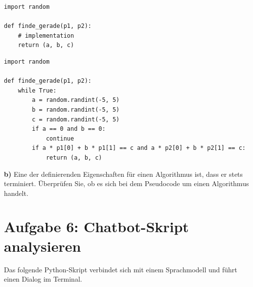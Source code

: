 \begin{lstlisting}[style=python]
import random

def finde_gerade(p1, p2):
    # implementation
    return (a, b, c)
\end{lstlisting}

\ifdefined\zeigloesungen
\begin{tcolorbox}[
    colback=loesungbg, colframe=loesungframe,
    fonttitle=\bfseries\small, title=L{\"o}sung,
    left=4pt, right=4pt, top=2pt, bottom=2pt,
    before skip=4pt, after skip=4pt
]
\begin{lstlisting}[style=python]
import random

def finde_gerade(p1, p2):
    while True:
        a = random.randint(-5, 5)
        b = random.randint(-5, 5)
        c = random.randint(-5, 5)
        if a == 0 and b == 0:
            continue
        if a * p1[0] + b * p1[1] == c and a * p2[0] + b * p2[1] == c:
            return (a, b, c)
\end{lstlisting}
\end{tcolorbox}
\fi
\medskip

\noindent \textbf{b)} Eine der definierenden Eigenschaften für einen Algorithmus ist, dass er stets terminiert. Überprüfen Sie, ob es sich bei dem Pseudocode um einen Algorithmus handelt.


\section*{Aufgabe 6: Chatbot-Skript analysieren}

\noindent Das folgende Python-Skript verbindet sich mit einem Sprachmodell und
führt einen Dialog im Terminal.


